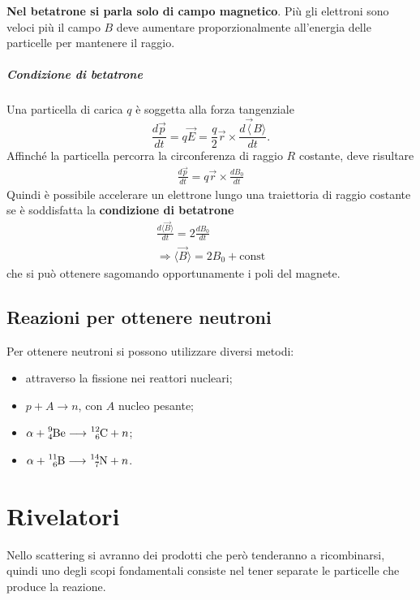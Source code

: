 \documentclass[a4paper,11pt,twoside,openany]{book}
\theoremstyle{definition}
\theoremstyle{plain}
\theoremstyle{plain}
\theoremstyle{definition}
\begin{document}
\textbf{Nel betatrone si parla solo di campo magnetico}. Più gli elettroni sono veloci più il campo $B$ deve aumentare proporzionalmente all'energia delle particelle per mantenere il raggio.

\paragraph{Condizione di betatrone} Una particella di carica $q$ è soggetta alla forza tangenziale $$\frac{d\vec p}{dt}=q\vec E=\frac{q}{2}\vec r\times \frac{d\vec \langle B\rangle}{dt}.$$ Affinché la particella percorra la circonferenza di raggio $R$ costante, deve risultare
\begin{equation}\begin{split}
\frac{d\vec p}{dt}=q\vec r\times \frac{dB_0}{dt}
\end{split}\end{equation}
Quindi è possibile accelerare un elettrone lungo una traiettoria di raggio costante se è soddisfatta la
\textbf{condizione di betatrone}
\begin{equation}\begin{split}
\frac{d\langle \vec B\rangle}{dt}=2\frac{dB_0}{dt}\\
\Longrightarrow \langle \vec B\rangle=2B_0+\textrm{const}
\end{split}\end{equation}
che si può ottenere sagomando opportunamente i poli del magnete.

\section{Reazioni per ottenere neutroni} %
Per ottenere neutroni si possono utilizzare diversi metodi:
\begin{itemize}
\item attraverso la fissione nei reattori nucleari;
\item $p+A\longrightarrow n$, con $A$ nucleo pesante;
\item $\alpha+\ce{^9_4Be}\longrightarrow \ce{^{12}_6C}+n$;
\item $\alpha+\ce{^{11}_6B}\longrightarrow \ce{^{14}_7N}+n$.
\end{itemize}

\chapter{Rivelatori} %
Nello scattering si avranno dei prodotti che però tenderanno a ricombinarsi, quindi uno degli scopi fondamentali consiste nel tener separate le particelle che produce la reazione.
\end{document}
